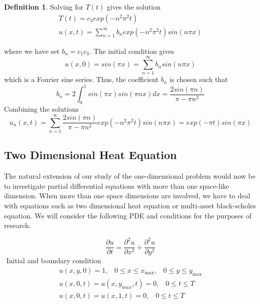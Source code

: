 \documentclass[12pt, oneside]{book}
\theoremstyle{plain}
\theoremstyle{definition}
\newtheorem{definition}[theorem]{Definition}
\begin{document}
\begin{definition}
Solving for $T(t)$ gives the solution
\begin{eqnarray}
T(t) = c_3 exp(-n^2 \pi ^2 t) \\[10pt]
u(x,t) = \sum_{n=1}^{\infty} b_n exp(-n^2 \pi ^2 t) sin(n \pi x)
\end{eqnarray}

where we have set $b_n = c_1 c_3$. The initial condition gives
\begin{equation}
u(x,0) = sin(\pi x) = \sum_{n=1}^{\infty} b_n sin(n \pi x)
\end{equation}
which is a Fourier sine series. Thus, the coefficient $b_n$ is chosen such that
\begin{equation}
b_n = 2 \int_{0}^{1} sin(\pi x) sin(\pi n x) dx = \frac{2sin(\pi n)}{\pi - \pi n^2}
\end{equation}
Combining the solutions
\begin{equation}
u_n(x,t) = \sum_{n=1}^{\infty} \frac{2sin(\pi n)}{\pi - \pi n^2} exp(-n^2 \pi ^2 t) sin(n \pi x)= exp(-\pi t) sin(\pi x)
\end{equation}
\end{definition}

\subsection{Two Dimensional Heat Equation}
The natural extension of our study of the one-dimensional problem would now be to investigate partial differential equations with more than one space-like dimension. When more than one space dimensions are involved, we have to deal with equations such as two dimensional heat equation or multi-asset black-scholes equation.  We will consider the following PDE and conditions for the purposes of research.

\begin{equation}
\frac{\partial u}{\partial t} = \frac{\partial^2 u}{\partial x^2} +\frac{\partial^2 u}{\partial y^2}
\end{equation}$  $
Initial and boundary condition
\begin{eqnarray} \label{HeatTwoBase}
u(x,y,0) = 1, \hspace{10pt} 0 \leq x \leq x_{\max}, \hspace{10pt} 0 \leq y \leq y_{\max} \\[10pt]
u(x, 0, t) = u(x, y_{max}, t) = 0, \hspace{10pt} 0 \leq t \leq T \\[10pt]
u(x, 0, t) = u(x, 1, t) = 0 , \hspace{10pt} 0 \leq t \leq T
\end{eqnarray}
\end{document}
